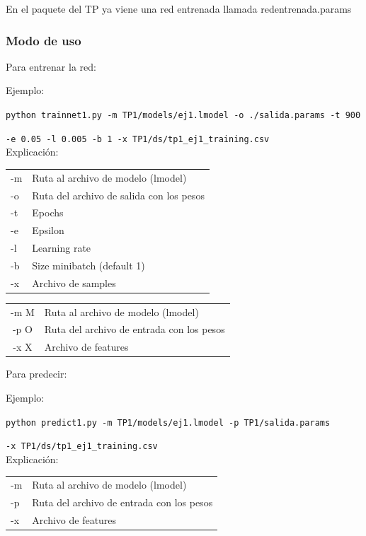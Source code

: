 En el paquete del TP ya viene una red entrenada llamada redentrenada.params


\subsubsection{Modo de uso}

Para entrenar la red:

Ejemplo: 

\noindent\texttt{python trainnet1.py -m TP1/models/ej1.lmodel -o ./salida.params -t 900 }

\texttt{-e 0.05 -l 0.005 -b 1 -x TP1/ds/tp1\_ej1\_training.csv} \\

Explicación:

\begin{tabular}{ l l }
-m & Ruta al archivo de modelo (lmodel) \\
-o & Ruta del archivo de salida con los pesos\\
-t & Epochs\\
-e & Epsilon\\
-l & Learning rate\\
-b & Size minibatch (default 1)\\
-x & Archivo de samples\\
\end{tabular}

\begin{tabular}{ c l }
-m M & Ruta al archivo de modelo (lmodel)\\
-p  O & Ruta del archivo de entrada con los pesos\\
-x  X & Archivo de features\\
\end{tabular}

Para predecir:

Ejemplo:

\noindent\texttt{\small{python predict1.py -m TP1/models/ej1.lmodel -p TP1/salida.params }}

\texttt{-x TP1/ds/tp1\_ej1\_training.csv} \\


Explicación:

\begin{tabular}{ l l }
-m & Ruta al archivo de modelo (lmodel)\\
-p & Ruta del archivo de entrada con los pesos\\
-x & Archivo de features\\
\end{tabular}

